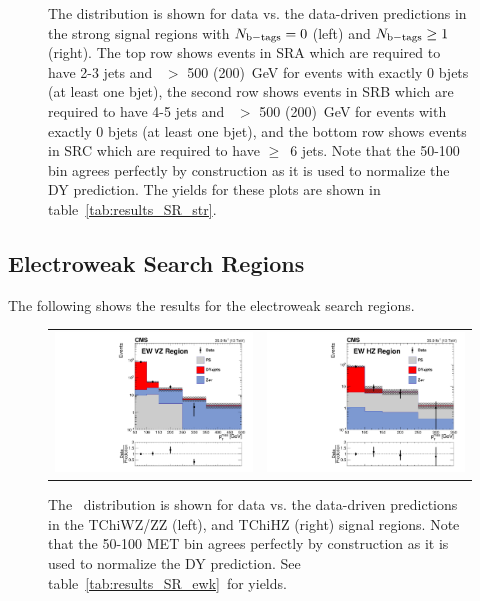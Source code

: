 \begin{figure}[!htb]
      \caption{\label{fig:results_SR_str} 
      The \MET distribution is shown for data vs. the data-driven predictions in the strong signal regions with $N_{\mathrm{b-tags}} = 0$ (left) and $N_{\mathrm{b-tags}} \geq 1$ (right).
      The top row shows events in SRA which are required to have 2-3 jets and \HT\ $>$ 500 (200)~GeV for events with exactly 0 bjets (at least one bjet),
      the second row shows events in SRB which are required to have 4-5 jets and \HT\ $>$ 500 (200)~GeV for events with exactly 0 bjets (at least one bjet),
      and the bottom row shows events in SRC which are required to have $\geq$~6 jets.
      Note that the 50-100 \MET bin agrees perfectly by construction as it is used to normalize the DY prediction. The yields for these plots are shown in table~\ref{tab:results_SR_str}.
      }
    \end{figure}

  \clearpage

  \subsection{Electroweak Search Regions}

    The following shows the results for the electroweak search regions. 

    \begin{figure}[!h]
      \centering
      \begin{tabular}{cc}
        \includegraphics[width=0.4\linewidth]{figures/results/h_met_SR_tcwz.pdf} &
        \includegraphics[width=0.4\linewidth]{figures/results/h_met_SR_tchz.pdf} \\
      \end{tabular}
      \caption{
        The \MET\ distribution is shown for data vs. the data-driven predictions in the TChiWZ/ZZ (left), and TChiHZ (right) signal regions. Note that the 50-100 MET bin agrees perfectly by construction as it is used to normalize the DY prediction. See table~\ref{tab:results_SR_ewk}~for yields.
        \label{fig:results_SR_ewk}
      }
    \end{figure}

